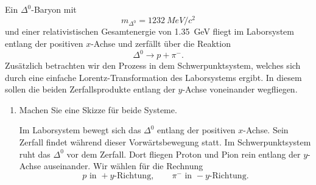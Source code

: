 \documentclass[11pt,a4paper]{scrartcl}
\begin{document}
    Ein $\Delta^0$-Baryon mit
    \[
        m_{\Delta^0}=\SI{1232}{MeV/c^2}
    \]
    und einer relativistischen Gesamtenergie von \SI{1.35}{GeV} fliegt im Laborsystem
    entlang der positiven $x$-Achse und zerfällt über die Reaktion
    \[
        \Delta^0 \longrightarrow p+\pi^-.
    \]
    Zusätzlich betrachten wir den Prozess in dem Schwerpunktsystem, welches sich durch
    eine einfache Lorentz-Transformation des Laborsystems ergibt. In diesem sollen die
    beiden Zerfallsprodukte entlang der $y$-Achse voneinander wegfliegen.

    \begin{enumerate}[label=(\alph*)]
        \item
            Machen Sie eine Skizze für beide Systeme.

            \begin{calculationbox}
                Im Laborsystem bewegt sich das $\Delta^0$ entlang der positiven $x$-Achse. Sein
                Zerfall findet während dieser Vorwärtsbewegung statt. Im Schwerpunktsystem ruht
                das $\Delta^0$ vor dem Zerfall. Dort fliegen Proton und Pion rein entlang der
                $y$-Achse auseinander. Wir wählen für die Rechnung
                \[
                    p \text{ in } +y\text{-Richtung},
                    \qquad
                    \pi^- \text{ in } -y\text{-Richtung}.
                \]

                \begin{center}
                \end{center}
            \end{calculationbox}


\end{enumerate}
\end{document}
